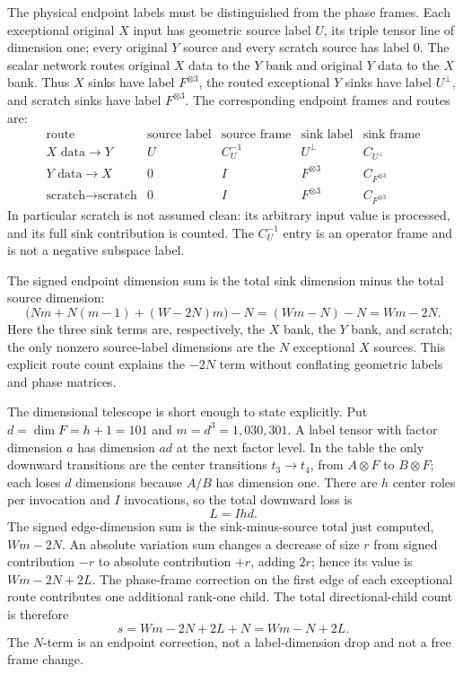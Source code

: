 The physical endpoint labels must be distinguished from the phase frames. Each exceptional original $X$ input has geometric source label $U$, its triple tensor line of dimension one; every original $Y$ source and every scratch source has label $0$. The scalar network routes original $X$ data to the $Y$ bank and original $Y$ data to the $X$ bank. Thus $X$ sinks have label $F^{\otimes3}$, the routed exceptional $Y$ sinks have label $U^\perp$, and scratch sinks have label $F^{\otimes3}$. The corresponding endpoint frames and routes are:
\[
\begin{array}{c|c|c|c|c}
\text{route}&\text{source label}&\text{source frame}&\text{sink label}&\text{sink frame}\\\hline
X\text{ data}\to Y&U&C_U^{-1}&U^\perp&C_{U^\perp}\\
Y\text{ data}\to X&0&I&F^{\otimes3}&C_{F^{\otimes3}}\\
\text{scratch}\to\text{scratch}&0&I&F^{\otimes3}&C_{F^{\otimes3}}
\end{array}
\]
In particular scratch is not assumed clean: its arbitrary input value is processed, and its full sink contribution is counted. The $C_U^{-1}$ entry is an operator frame and is not a negative subspace label.

The signed endpoint dimension sum is the total sink dimension minus the total source dimension:
\[
\bigl(Nm+N(m-1)+(W-2N)m\bigr)-N=(Wm-N)-N=Wm-2N.
\]
Here the three sink terms are, respectively, the $X$ bank, the $Y$ bank, and scratch; the only nonzero source-label dimensions are the $N$ exceptional $X$ sources. This explicit route count explains the $-2N$ term without conflating geometric labels and phase matrices.

The dimensional telescope is short enough to state explicitly. Put $d=\dim F=h+1=101$ and $m=d^3=1{,}030{,}301$. A label tensor with factor dimension $a$ has dimension $a d$ at the next factor level. In the table the only downward transitions are the center transitions $t_3\to t_4$, from $A\otimes F$ to $B\otimes F$; each loses $d$ dimensions because $A/B$ has dimension one. There are $h$ center roles per invocation and $I$ invocations, so the total downward loss is
\[
 L=Ihd.
\]
The signed edge-dimension sum is the sink-minus-source total just computed, $Wm-2N$. An absolute variation sum changes a decrease of size $r$ from signed contribution $-r$ to absolute contribution $+r$, adding $2r$; hence its value is $Wm-2N+2L$. The phase-frame correction on the first edge of each exceptional route contributes one additional rank-one child. The total directional-child count is therefore
\[
 s=Wm-2N+2L+N=Wm-N+2L.
\]
The $N$-term is an endpoint correction, not a label-dimension drop and not a free frame change.

